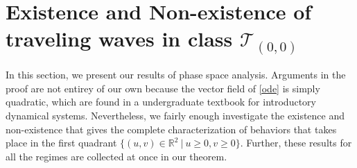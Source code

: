 \documentclass{amsart}
\theoremstyle{definition}
\numberwithin{equation}{section}
\begin{document}
\newpage
\section{Existence and Non-existence of traveling waves in class $\mathcal{T}_{(0,0)}$}

In this section, we present our results of phase space analysis. Arguments in the proof are not entirey of our own because the vector field of \eqref{ode} is simply quadratic, which are found in a undergraduate textbook for introductory dynamical systems. Nevertheless, we fairly enough investigate the existence and non-existence that gives the complete characterization of behaviors that takes place in the first quadrant $\{(u,v) \in \mathbb{R}^2 ~|~ u \ge0, v\ge0\}$. Further, these results for all the regimes are collected at once in our theorem.
\end{document}
